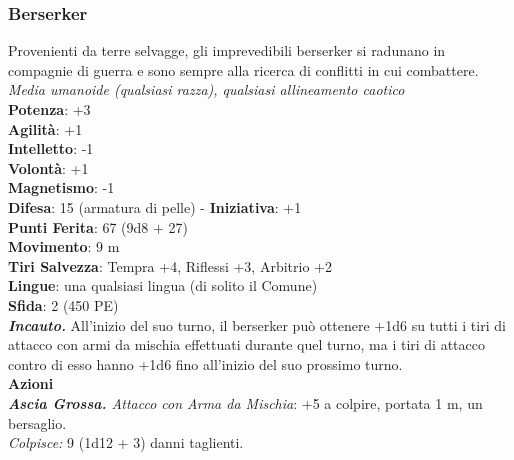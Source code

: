 \begin{multicols}{2}
\subsubsection{Berserker}

Provenienti da terre selvagge, gli imprevedibili berserker si radunano in compagnie di guerra e sono sempre alla ricerca di conflitti in cui combattere.\\
\emph{Media umanoide (qualsiasi razza), qualsiasi allineamento caotico}\\
\textbf{Potenza}: +3\\
\textbf{Agilità}: +1\\
\textbf{Intelletto}: -1\\
\textbf{Volontà}: +1\\
\textbf{Magnetismo}: -1\\
\textbf{Difesa}: 15 (armatura di pelle) - \textbf{Iniziativa}: +1\\
\textbf{Punti Ferita}: 67 (9d8 + 27)\\
\textbf{Movimento}: 9 m\\
\textbf{Tiri Salvezza}: Tempra +4, Riflessi +3, Arbitrio +2 \\
\textbf{Lingue}: una qualsiasi lingua (di solito il Comune)\\
\textbf{Sfida}: 2 (450 PE)\smallskip\\
\emph{\textbf{Incauto.}} All'inizio del suo turno, il berserker può ottenere +1d6 su tutti i tiri di attacco con armi da mischia effettuati durante quel turno, ma i tiri di attacco contro di esso hanno +1d6 fino all'inizio del suo prossimo turno.\\
\smallskip\textbf{Azioni} \\
\emph{\textbf{Ascia Grossa.} Attacco con Arma da Mischia}: +5 a colpire, portata 1 m, un bersaglio.\\
\emph{Colpisce:} 9 (1d12 + 3) danni taglienti. \\



\end{multicols}
